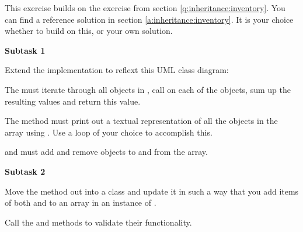 This exercise builds on the exercise from section \ref{q:inheritance:inventory}. You can find a reference solution in section \ref{a:inheritance:inventory}. It is your choice whether to build on this, or your own solution.

\textbf{Subtask 1}

Extend the implementation to reflext this UML class diagram:


The  must iterate through all  objects in , call  on each of the objects, sum up the resulting values and return this value.

The  method must print out a textual representation of all the objects in the  array using . Use a loop of your choice to accomplish this.

 and  must add and remove objects to and from the  array.

\textbf{Subtask 2}

Move the  method out into a  class and update it in such a way that you add items of both  and  to an  array in an instance of .

Call the  and  methods to validate their functionality.

